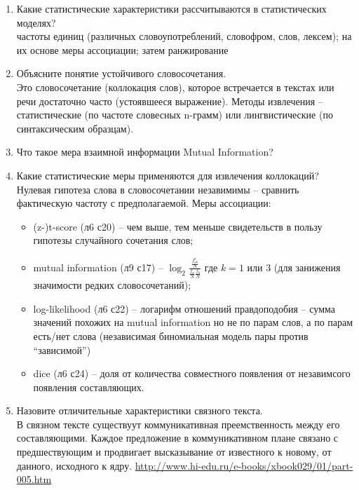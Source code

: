 \documentclass[a4paper]{article}
\newcommand{\eng}[1]{\foreignlanguage{english}{#1}}
\begin{document}
\begin{enumerate}
	\item Какие статистические характеристики рассчитываются в статистических моделях?\hfill\\
	частоты единиц (различных словоупотреблений, словофром, слов, лексем); на их основе меры ассоциации; затем ранжирование

	\item Объясните понятие устойчивого словосочетания.\hfill\\
	Это словосочетание (коллокация слов), которое встречается в текстах или речи достаточно часто (устоявшееся выражение). Методы извлечения -- статистические (по частоте словесных n-грамм) или лингвистические (по синтаксическим образцам).

	\item Что такое мера взаимной информации Mutual Information?\hfill\\
	\item Какие статистические меры применяются для извлечения коллокаций?\hfill\\
	Нулевая гипотеза слова в словосочетании незавимимы -- сравнить фактическую частоту с предполагаемой. Меры ассоциации: \begin{itemize}
		\item \eng{(z-)t-score} (л6 с20) -- чем выше, тем меньше свидетельств в пользу гипотезы случайного сочетания слов;
		\item \eng{mutual information} (л9 с17) -- $\log_2 \frac{ \frac{f_{ab}^k}{N}}{ \frac{f_a}{N}\frac{f_b}{N}}$ где $k = 1$ или $3$ (для занижения значимости редких словосочетаний);  
		\item \eng{log-likelihood} (л6 с22) -- логарифм отношений правдоподобия -- сумма значений похожих на mutual information но не по парам слов, а по парам есть/нет слова (независимая биномиальная модель пары против ``зависимой'')
		\item \eng{dice} (л6 с24) -- доля от количества совместного появления от незавимсого появления составляющих.
	\end{itemize}

	\item Назовите отличительные характеристики связного текста.\hfill\\
	В связном тексте существуут коммуникативная преемственность между его составляющими. Каждое предложение в коммуникативном плане связано с предшествующим и продвигает высказывание от известного к новому, от данного, исходного к ядру.
	\url{http://www.hi-edu.ru/e-books/xbook029/01/part-005.htm}


\end{enumerate}
\end{document}
